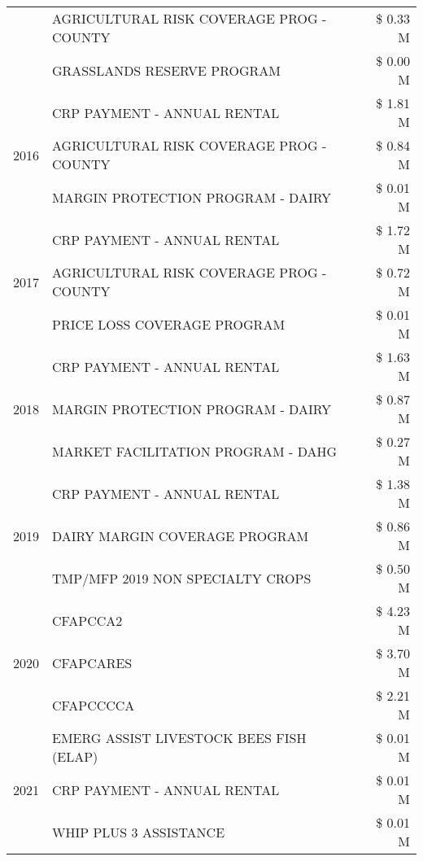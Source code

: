 \begin{tabular}{llr}
 & AGRICULTURAL RISK COVERAGE PROG - COUNTY & \$ 0.33 M \\
 & GRASSLANDS RESERVE PROGRAM & \$ 0.00 M \\
\cline{1-3}
\multirow[t]{3}{*}{2016} & CRP PAYMENT - ANNUAL RENTAL & \$ 1.81 M \\
 & AGRICULTURAL RISK COVERAGE PROG - COUNTY & \$ 0.84 M \\
 & MARGIN PROTECTION PROGRAM - DAIRY & \$ 0.01 M \\
\cline{1-3}
\multirow[t]{3}{*}{2017} & CRP PAYMENT - ANNUAL RENTAL & \$ 1.72 M \\
 & AGRICULTURAL RISK COVERAGE PROG - COUNTY & \$ 0.72 M \\
 & PRICE LOSS COVERAGE PROGRAM & \$ 0.01 M \\
\cline{1-3}
\multirow[t]{3}{*}{2018} & CRP PAYMENT - ANNUAL RENTAL & \$ 1.63 M \\
 & MARGIN PROTECTION PROGRAM - DAIRY & \$ 0.87 M \\
 & MARKET FACILITATION PROGRAM - DAHG & \$ 0.27 M \\
\cline{1-3}
\multirow[t]{3}{*}{2019} & CRP PAYMENT - ANNUAL RENTAL & \$ 1.38 M \\
 & DAIRY MARGIN COVERAGE PROGRAM & \$ 0.86 M \\
 & TMP/MFP 2019 NON SPECIALTY CROPS & \$ 0.50 M \\
\cline{1-3}
\multirow[t]{3}{*}{2020} & CFAPCCA2 & \$ 4.23 M \\
 & CFAPCARES & \$ 3.70 M \\
 & CFAPCCCCA & \$ 2.21 M \\
\cline{1-3}
\multirow[t]{3}{*}{2021} & EMERG ASSIST LIVESTOCK BEES FISH (ELAP) & \$ 0.01 M \\
 & CRP PAYMENT - ANNUAL RENTAL & \$ 0.01 M \\
 & WHIP PLUS 3 ASSISTANCE & \$ 0.01 M \\
\cline{1-3}
\bottomrule
\end{tabular}
